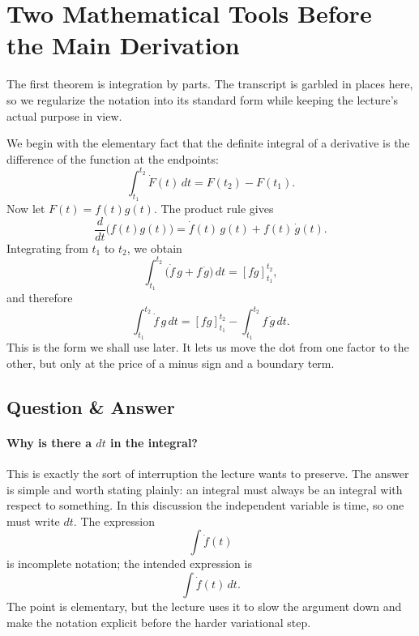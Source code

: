 \section{Two Mathematical Tools Before the Main Derivation}

The first theorem is integration by parts. The transcript is garbled in places here, so we regularize the notation into its standard form while keeping the lecture's actual purpose in view.

We begin with the elementary fact that the definite integral of a derivative is the difference of the function at the endpoints:
\begin{equation}
\int_{t_1}^{t_2}\dot F(t)\,dt = F(t_2)-F(t_1).
\end{equation}
Now let \(F(t)=f(t)g(t)\). The product rule gives
\begin{equation}
\frac{d}{dt}\big(f(t)g(t)\big)=\dot f(t)\,g(t)+f(t)\,\dot g(t).
\end{equation}
Integrating from \(t_1\) to \(t_2\), we obtain
\begin{equation}
\int_{t_1}^{t_2}\big(\dot f\,g+f\,\dot g\big)\,dt=[fg]_{t_1}^{t_2},
\end{equation}
and therefore
\begin{equation}
\int_{t_1}^{t_2}\dot f\,g\,dt=[fg]_{t_1}^{t_2}-\int_{t_1}^{t_2}f\,\dot g\,dt.
\end{equation}
This is the form we shall use later. It lets us move the dot from one factor to the other, but only at the price of a minus sign and a boundary term.

\subsection{Question \& Answer}

\paragraph{Why is there a \(dt\) in the integral?}
This is exactly the sort of interruption the lecture wants to preserve. The answer is simple and worth stating plainly: an integral must always be an integral with respect to something. In this discussion the independent variable is time, so one must write \(dt\). The expression
\[
\int \dot f(t)
\]
is incomplete notation; the intended expression is
\[
\int \dot f(t)\,dt.
\]
The point is elementary, but the lecture uses it to slow the argument down and make the notation explicit before the harder variational step.

